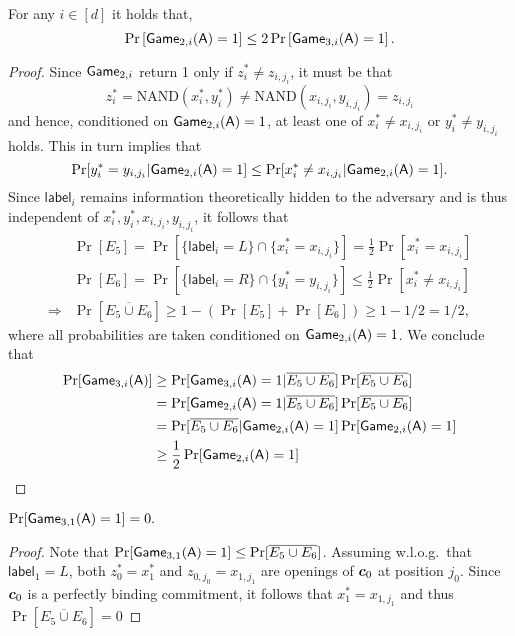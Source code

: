 \begin{lemma} \label{lemma:2-3}
For any $i\in[d]$ it holds that,  
$$\Pr\left[ \mathsf{Game}_{2,i}(\mathsf{A})=1\right]\leq 2\Pr\left[ \mathsf{Game}_{3,i}(\mathsf{A})=1\right].$$
\end{lemma}
\begin{proof}
Since $\mathsf{Game}_{2,i}$ return 1 only if $z^*_i \neq z_{i,j_i}$, it must be that
$$
z^*_i = \mathrm{NAND}(x^*_i,y^*_i) \neq \mathrm{NAND}(x_{i,j_i},y_{i,j_i}) = z_{i,j_i}
$$
and hence, conditioned on $\mathsf{Game}_{2,i}(\mathsf{A})=1$, at least one of $x^*_i\neq x_{i,j_i}$ or $y^*_i\neq y_{i,j_i}$ holds. This in turn implies that
$$
\Pr[y^*_i = y_{i,{j_i}}|\mathsf{Game}_{2,i}(\mathsf{A})=1] \leq \Pr[x^*_i \neq x_{i,{j_i}}|\mathsf{Game}_{2,i}(\mathsf{A})=1].
$$
Since $\mathsf{label}_i$ remains information theoretically hidden to the adversary and is thus independent of $x^*_i,y^*_i,x_{i,j_i},y_{i,j_i}$, it follows that
\begin{align*}
&\Pr[E_5] = \Pr[\{\mathsf{label}_i = L\} \cap \{x^*_i = x_{i,{j_i}}\}] = \frac{1}{2}\Pr[x^*_i = x_{i,{j_i}}]\\
&\Pr[E_6] = \Pr[\{\mathsf{label}_i = R\} \cap \{y^*_i = y_{i,{j_i}}\}] \leq \frac{1}{2}\Pr[x^*_i \neq x_{i,{j_i}}]\\
\Longrightarrow
& \Pr[\overline{E_5\cup E_6}] \geq 1 - (\Pr[E_5]+\Pr[E_6]) \geq 1-1/2=1/2,
\end{align*}
where all probabilities are taken conditioned on $\mathsf{Game}_{2,i}(\mathsf{A})=1$.
We conclude that
\begin{align*}
\Pr[\mathsf{Game}_{3,i}(\mathsf{A})] &\geq \Pr[\mathsf{Game}_{3,i}(\mathsf{A})=1|\overline{E_5\cup E_6}]\Pr[\overline{E_5\cup E_6}] \\
& = \Pr[\mathsf{Game}_{2,i}(\mathsf{A})=1|\overline{E_5\cup E_6}]\Pr[\overline{E_5\cup E_6}]\\
& = \Pr[\overline{E_5\cup E_6}|\mathsf{Game}_{2,i}(\mathsf{A})=1]\Pr[\mathsf{Game}_{2,i}(\mathsf{A})=1]\\
& \geq \frac{1}{2}\Pr[\mathsf{Game}_{2,i}(\mathsf{A})=1]
\end{align*}
\end{proof}

\begin{lemma}
$\Pr[\mathsf{Game}_{3,1}(\mathsf{A})=1]=0.$
\end{lemma}
\begin{proof}
Note that $\Pr[\mathsf{Game}_{3,1}(\mathsf{A})=1]\leq \Pr[\overline{E_5\cup E_6}]$. Assuming w.l.o.g.~that $\mathsf{label}_1=L$, both $z^*_0 = x^*_1$ and $z_{0,j_0}=x_{1,j_1}$ are openings of ${\boldsymbol{c}}_0$ at position $j_0$. Since ${\boldsymbol{c}}_0$ is a perfectly binding commitment, it follows that $x^*_1=x_{1,j_1}$ and thus $\Pr[\overline{E_5\cup E_6}]=0$
\end{proof}

